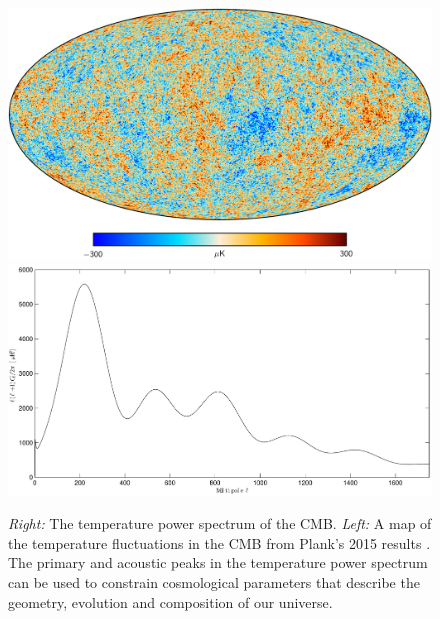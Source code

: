 \documentclass[12pt]{article}
\begin{document}
\begin{figure}
	\center
	\includegraphics[width=.4\textwidth]{2015_SMICA_CMB.png}
	\includegraphics[width=.4\textwidth]{temp_aps.pdf}
	\caption{\textit{Right:} The temperature power spectrum of the CMB.
	\textit{Left:} A map of the temperature fluctuations in the CMB from
	Plank's 2015 results \cite{cite:planckmap}. The primary and acoustic peaks
	in the temperature power spectrum can be used to constrain cosmological
	parameters that describe the geometry, evolution and composition of our
	universe.}
	\label{fig:temp_aps}

\end{figure}



\end{document}
